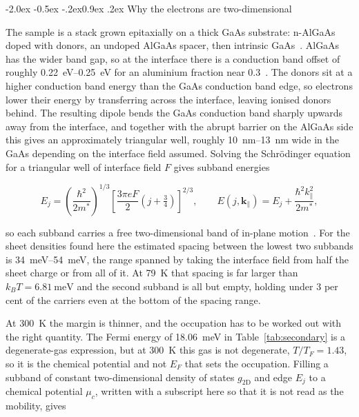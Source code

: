 \documentclass[11pt,a4paper]{article}
\makeatletter
\renewcommand\subsection{\@startsection{subsection}{2}{\z@}%
  {-2.0ex \@plus -0.5ex \@minus -.2ex}{0.9ex \@plus .2ex}%
  {\normalfont\normalsize\bfseries}}
\makeatother
\begin{document}
\subsection{Why the electrons are two-dimensional}
\label{sec:hetero}

The sample is a stack grown epitaxially on a thick GaAs substrate: n-AlGaAs doped with
donors, an undoped AlGaAs spacer, then intrinsic GaAs~\cite{script}. AlGaAs has the wider
band gap, so at the interface there is a conduction band offset of roughly
\qtyrange{0.22}{0.25}{\electronvolt} for an aluminium fraction near
\num{0.3}~\cite{vurgaftman2001}. The donors sit at a higher conduction band energy than the
GaAs conduction band edge, so electrons lower their energy by transferring across the
interface, leaving ionised donors behind. The resulting dipole bends the GaAs conduction band
sharply upwards away from the interface, and together with the abrupt barrier on the AlGaAs
side this gives an approximately triangular well, roughly \qtyrange{10}{13}{\nano\metre} wide
in the GaAs depending on the interface field assumed. Solving the Schr\"odinger equation for a
triangular well of interface field $F$ gives subband energies

\begin{equation}
E_j = \left(\frac{\hbar^2}{2m^{*}}\right)^{1/3}
\left[\frac{3\pi e F}{2}\left(j + \tfrac{3}{4}\right)\right]^{2/3},
\qquad
E(j,\mathbf{k}_\parallel) = E_j + \frac{\hbar^2 k_\parallel^2}{2m^{*}},
\label{eq:subband}
\end{equation}

so each subband carries a free two-dimensional band of in-plane motion~\cite{ando1982}. For
the sheet densities found here the estimated spacing between the lowest two subbands is
\qtyrange{34}{54}{\milli\electronvolt}, the range spanned by taking the interface field from
half the sheet charge or from all of it. At \qty{79}{\kelvin} that spacing is far larger than
$k_BT = \qty{6.81}{\milli\electronvolt}$ and the second subband is all but empty, holding under
\num{3} per cent of the carriers even at the bottom of the spacing range.

At \qty{300}{\kelvin} the margin is thinner, and the occupation has to be worked out with the
right quantity. The Fermi energy of \qty{18.06}{\milli\electronvolt} in
Table~\ref{tab:secondary} is a degenerate-gas expression, but at \qty{300}{\kelvin} this gas is
not degenerate, $T/T_F = 1.43$, so it is the chemical potential and not $E_F$ that sets the
occupation. Filling a subband of constant two-dimensional density of states
$g_{\mathrm{2D}}$ and edge $E_j$ to a chemical potential $\mu_c$, written with a subscript here
so that it is not read as the mobility, gives
\end{document}
